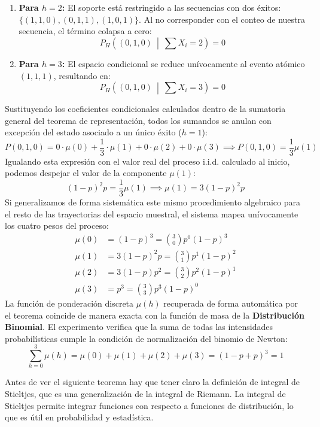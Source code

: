 \begin{ejemplo}
\begin{enumerate}
        \item \textbf{Para $h=2$:} El soporte está restringido a las secuencias con dos éxitos: $\{(1,1,0), (0,1,1), (1,0,1)\}$. Al no corresponder con el conteo de nuestra secuencia, el término colapsa a cero:
        \begin{equation*}
            P_H \left( (0,1,0) \ \middle| \ \sum X_i = 2 \right) = 0
        \end{equation*}
        
        \item \textbf{Para $h=3$:} El espacio condicional se reduce unívocamente al evento atómico $(1,1,1)$, resultando en:
        \begin{equation*}
            P_H \left( (0,1,0) \ \middle| \ \sum X_i = 3 \right) = 0
        \end{equation*}
    \end{enumerate}
    Sustituyendo los coeficientes condicionales calculados dentro de la sumatoria general del teorema de representación, todos los sumandos se anulan con excepción del estado asociado a un único éxito ($h=1$):
    \begin{equation*}
        P(0,1,0) = 0 \cdot \mu(0) + \frac{1}{3} \cdot \mu(1) + 0 \cdot \mu(2) + 0 \cdot \mu(3) \implies P(0,1,0) = \frac{1}{3} \mu(1)
    \end{equation*}
    Igualando esta expresión con el valor real del proceso i.i.d. calculado al inicio, podemos despejar el valor de la componente $\mu(1)$:
    \begin{equation*}
        (1-p)^2 p = \frac{1}{3} \mu(1) \implies \mu(1) = 3(1-p)^2 p
    \end{equation*}
    Si generalizamos de forma sistemática este mismo procedimiento algebraico para el resto de las trayectorias del espacio muestral, el sistema mapea unívocamente los cuatro pesos del proceso:
    \begin{align*}
        \mu(0) &= (1-p)^3 = \binom{3}{0} p^0 (1-p)^3 \\
        \mu(1) &= 3(1-p)^2 p = \binom{3}{1} p^1 (1-p)^2 \\
        \mu(2) &= 3(1-p) p^2 = \binom{3}{2} p^2 (1-p)^1 \\
        \mu(3) &= p^3 = \binom{3}{3} p^3 (1-p)^0
    \end{align*}
    La función de ponderación discreta $\mu(h)$ recuperada de forma automática por el teorema coincide de manera exacta con la función de masa de la \textbf{Distribución Binomial}. El experimento verifica que la suma de todas las intensidades probabilísticas cumple la condición de normalización del binomio de Newton:
    \begin{equation*}
        \sum_{h=0}^{3} \mu(h) = \mu(0) + \mu(1) + \mu(2) + \mu(3) = (1-p+p)^3 = 1
    \end{equation*}
\end{ejemplo}
Antes de ver el siguiente teorema hay que tener claro la definición de integral de Stieltjes, que es una generalización de la integral de Riemann. La integral de Stieltjes permite integrar funciones con respecto a funciones de distribución, lo que es útil en probabilidad y estadística.

